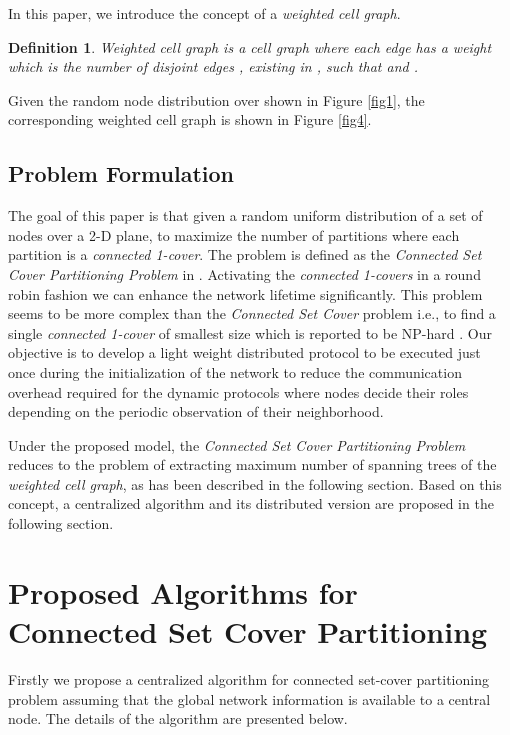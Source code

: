 \documentclass{acm_proc_article-sp}
\newtheorem{definition}{Definition}
\begin{document}
  \vspace{-0.45cm}
 In this paper, we introduce the concept of a {\it weighted cell graph}.
  \vspace{-0.4cm}
 \begin{definition}
  Weighted cell graph is a cell graph where each edge  has a weight  which is the number of disjoint edges , existing in , such that  and . 
 \end{definition}
\vspace{-0.5cm}
Given the random node distribution over  shown in Figure \ref{fig1}, the corresponding weighted cell graph is shown in Figure \ref{fig4}.
\subsection{Problem Formulation} 
The goal of this paper is that given a random uniform distribution of a set of  nodes over a 2-D plane, to maximize the number of partitions where each partition is a {\it connected 1-cover}. The problem is defined as the {\it Connected Set Cover Partitioning Problem} in \cite{Pervin}. Activating the {\it connected 1-covers} in a round robin fashion we can enhance the network lifetime significantly. This problem seems to be more complex than the {\it Connected Set Cover} problem i.e., to find a single {\it connected 1-cover} of smallest size which is reported to be NP-hard \cite{SSlij}. Our objective is to develop a light weight distributed protocol to be executed just once during the initialization of the network to reduce the communication overhead required for the dynamic protocols where nodes decide their roles depending on the periodic observation of their neighborhood.

Under the proposed model, the {\it Connected Set Cover Partitioning Problem} reduces to the problem of extracting maximum number of spanning trees of the {\it weighted cell graph}, as has been described in the following section. Based on this concept, a centralized algorithm and its distributed version are proposed in the following section. 
\section{Proposed Algorithms for Connected Set Cover Partitioning}
\label{sec_3}
\vspace{0.3cm}
Firstly we propose a centralized algorithm for connected set-cover partitioning problem assuming that the global network information is available to a central node. The details of the algorithm are presented below.
\vspace{-0.3cm}
\end{document}
